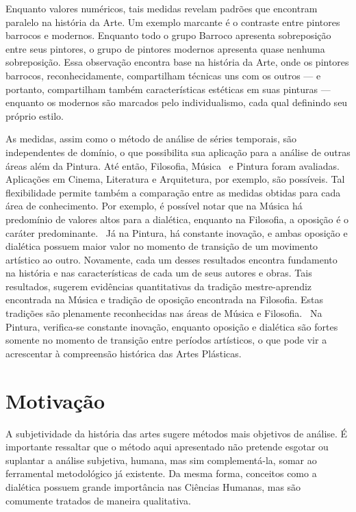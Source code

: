 Enquanto valores numéricos, tais medidas revelam padrões que encontram
paralelo na história da Arte. Um exemplo marcante é o contraste entre
pintores barrocos e modernos. Enquanto todo o grupo Barroco apresenta
sobreposição entre seus pintores, o grupo de pintores modernos
apresenta quase nenhuma sobreposição. Essa observação encontra base na
história da Arte, onde os pintores barrocos, reconhecidamente,
compartilham técnicas uns com os outros --- e portanto, compartilham
também características estéticas em suas pinturas --- enquanto os
modernos são marcados pelo individualismo, cada qual definindo seu
próprio estilo.

As medidas, assim como o método de análise de séries temporais, são
independentes de domínio, o que possibilita sua aplicação para a
análise de outras áreas além da Pintura. Até então, Filosofia,
Música~\cite{vieira} e Pintura foram avaliadas. Aplicações em Cinema,
Literatura e Arquitetura, por exemplo, são possíveis. Tal
flexibilidade permite também a comparação entre as medidas obtidas
para cada área de conhecimento. Por exemplo, é possível notar que na
Música há predomínio de valores altos para a dialética, enquanto na
Filosofia, a oposição é o caráter predominante.~\cite{vieira} Já na
Pintura, há constante inovação, e ambas oposição e dialética possuem
maior valor no momento de transição de um movimento artístico ao
outro. Novamente, cada um desses resultados encontra fundamento na
história e nas características de cada um de seus autores e
obras. Tais resultados, sugerem evidências quantitativas da tradição
mestre-aprendiz encontrada na Música e tradição de oposição encontrada
na Filosofia. Estas tradições são plenamente reconhecidas nas áreas de
Música e Filosofia.~\cite{vieira} Na Pintura, verifica-se constante
inovação, enquanto oposição e dialética são fortes somente no momento
de transição entre períodos artísticos, o que pode vir a acrescentar à
compreensão histórica das Artes Plásticas.

\section{Motivação}

A subjetividade da história das artes sugere métodos mais objetivos de
análise. É importante ressaltar que o método aqui apresentado não
pretende esgotar ou suplantar a análise subjetiva, humana, mas sim
complementá-la, somar ao ferramental metodológico já existente. Da
mesma forma, conceitos como a dialética possuem grande importância nas
Ciências Humanas, mas são comumente tratados de maneira qualitativa.

